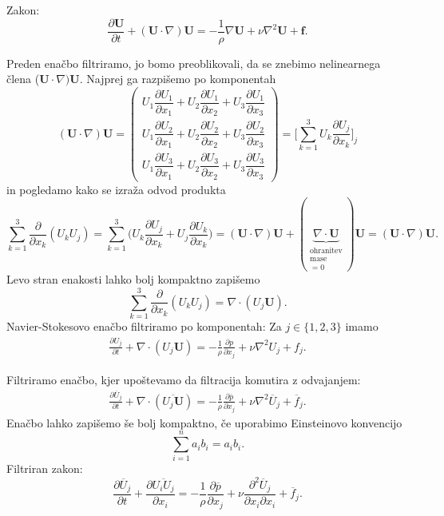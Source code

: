 \documentclass[mat2, tisk]{fmfdelo}
\newcommand{\bd}{\textbf}
\begin{document}
Zakon: 
$$
\frac{\partial \bd{U}}{\partial t} + (\bd{U}\cdot \nabla)\bd{U} = -\frac{1}{\rho} \nabla \bd{U} + \nu\nabla^2 \bd{U} + \bd{f}.
$$

\noindent
Preden enačbo filtriramo, jo bomo preoblikovali, da se znebimo nelinearnega člena ($\bd{U}\cdot \nabla)\bd{U}$.
Najprej ga razpišemo po komponentah 
\renewcommand{\arraystretch}{2.5} %
\[
(\bd{U} \cdot \nabla) \bd{U} =
\begin{pmatrix}
U_1 \dfrac{\partial U_1}{\partial x_1} + U_2 \dfrac{\partial U_1}{\partial x_2} + U_3 \dfrac{\partial U_1}{\partial x_3} \\
U_1 \dfrac{\partial U_2}{\partial x_1} + U_2 \dfrac{\partial U_2}{\partial x_2} + U_3 \dfrac{\partial U_2}{\partial x_3} \\
U_1 \dfrac{\partial U_3}{\partial x_1} + U_2 \dfrac{\partial U_3}{\partial x_2} + U_3 \dfrac{\partial U_3}{\partial x_3}
\end{pmatrix} = \Big[\sum_{k=1}^3 U_k \frac{\partial U_j}{\partial x_k}\Big]_j
\]
in pogledamo kako se izraža odvod produkta
$$
\sum_{k=1}^3 \frac{\partial}{\partial x_k} (U_k U_j) = \sum_{k=1}^3 \Big(U_k\frac{\partial U_j}{\partial x_k}
+ U_j\frac{\partial U_k}{\partial x_k}\Big) = (\bd{U}\cdot \nabla)\bd{U} + (\underbrace{\nabla\cdot \bd{U}}_{\substack{\text{ohranitev}\\{\text{mase}}\\=0}}) \bd{U}
= (\bd{U}\cdot \nabla)\bd{U}.
$$
Levo stran enakosti lahko bolj kompaktno zapišemo
$$
\sum_{k=1}^3 \frac{\partial}{\partial x_k} (U_k U_j) = \nabla \cdot (U_j \bd{U}).
$$
Navier-Stokesovo enačbo filtriramo po komponentah:
Za $j\in \{1, 2, 3\}$ imamo 
\begin{align*}
\frac{\partial U_j}{\partial t} + \nabla\cdot(U_j \bd{U}) = -\frac{1}{\rho} \frac{\partial p}{\partial x_j} + \nu\nabla^2 U_j + f_j.
\end{align*}

Filtriramo enačbo, kjer upoštevamo da filtracija komutira z odvajanjem:
\begin{align*}
  \frac{\partial \overline{U}_j}{\partial t} + \nabla\cdot(\overline{U_j \bd{U}}) = -\frac{1}{\rho} \frac{\partial \overline{p}}{\partial x_j} + \nu\nabla^2 \overline{U}_j + \overline{f}_j.
\end{align*}
Enačbo lahko zapišemo še bolj kompaktno, če uporabimo Einsteinovo konvencijo 
$$
\sum_{i=1}^n a_i b_i = a_i b_i.
$$
Filtriran zakon:
\begin{equation}
\frac{\partial \overline{U}_j}{\partial t} + \frac{\partial \overline{U_i U_j}}{\partial x_i} = -\frac{1}{\rho} \frac{\partial \overline{p}}{\partial x_j} + \nu \frac{\partial^2 \overline{U}_j}{\partial x_i \partial x_i} + \overline{f}_j.
\end{equation}
\end{document}
